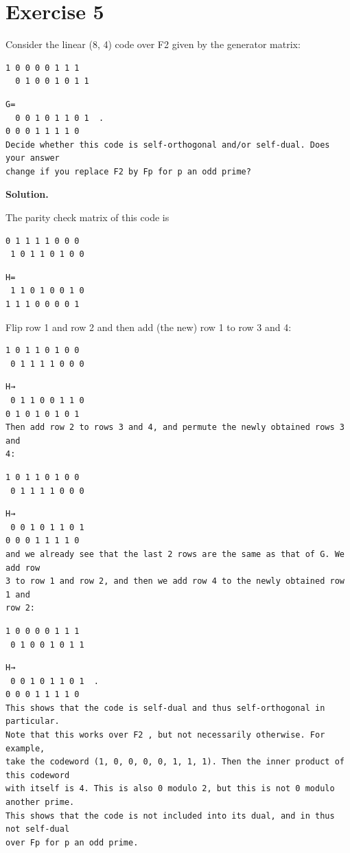 \documentclass[11pt]{article}
\begin{document}
\section*{Exercise 5}
\begin{exercisebox}
Consider the linear (8, 4) code over F2 given by the generator matrix:

\begin{Verbatim}[fontsize=\small]
1 0 0 0 0 1 1 1
  0 1 0 0 1 0 1 1
\end{Verbatim}
\begin{Verbatim}[fontsize=\small]
G=
  0 0 1 0 1 1 0 1  .
0 0 0 1 1 1 1 0
Decide whether this code is self-orthogonal and/or self-dual. Does your answer
change if you replace F2 by Fp for p an odd prime?
\end{Verbatim}
\end{exercisebox}
\begin{solutionbox}
\textbf{Solution.}

The parity check matrix of this code is

\begin{Verbatim}[fontsize=\small]
0 1 1 1 1 0 0 0
 1 0 1 1 0 1 0 0
\end{Verbatim}
\begin{Verbatim}[fontsize=\small]
H=
 1 1 0 1 0 0 1 0
1 1 1 0 0 0 0 1
\end{Verbatim}
Flip row 1 and row 2 and then add (the new) row 1 to row 3 and 4:

\begin{Verbatim}[fontsize=\small]
1 0 1 1 0 1 0 0
 0 1 1 1 1 0 0 0
\end{Verbatim}
\begin{Verbatim}[fontsize=\small]
H→
 0 1 1 0 0 1 1 0
0 1 0 1 0 1 0 1
Then add row 2 to rows 3 and 4, and permute the newly obtained rows 3 and
4:
\end{Verbatim}
\begin{Verbatim}[fontsize=\small]
1 0 1 1 0 1 0 0
 0 1 1 1 1 0 0 0
\end{Verbatim}
\begin{Verbatim}[fontsize=\small]
H→
 0 0 1 0 1 1 0 1
0 0 0 1 1 1 1 0
and we already see that the last 2 rows are the same as that of G. We add row
3 to row 1 and row 2, and then we add row 4 to the newly obtained row 1 and
row 2:
\end{Verbatim}
\begin{Verbatim}[fontsize=\small]
1 0 0 0 0 1 1 1
 0 1 0 0 1 0 1 1
\end{Verbatim}
\begin{Verbatim}[fontsize=\small]
H→
 0 0 1 0 1 1 0 1  .
0 0 0 1 1 1 1 0
This shows that the code is self-dual and thus self-orthogonal in particular.
Note that this works over F2 , but not necessarily otherwise. For example,
take the codeword (1, 0, 0, 0, 0, 1, 1, 1). Then the inner product of this codeword
with itself is 4. This is also 0 modulo 2, but this is not 0 modulo another prime.
This shows that the code is not included into its dual, and in thus not self-dual
over Fp for p an odd prime.
\end{Verbatim}
\end{solutionbox}
\end{document}

